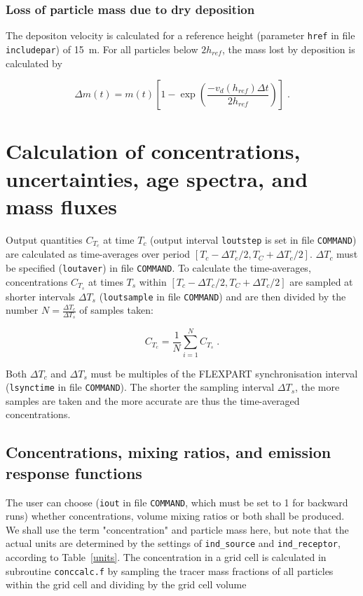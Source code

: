 \documentclass{egu}                  %
\begin{document}
\subsubsection{Loss of particle mass due to dry deposition}

The depositon velocity is calculated for a reference height (parameter
\verb|href| in file \verb|includepar|) of 15~m.  For all particles below
$2h_{ref}$, the mass lost by deposition is calculated by

\begin{equation}
\Delta m(t)=m(t)\left[{1-\exp\left({\frac{-v_d(h_{ref})\Delta t}{2h_{ref}}}\right)}\right] \;.
\end{equation}

\section{\label{conccalc}Calculation of concentrations, uncertainties, age spectra, and mass fluxes}

Output quantities $C_{T_c}$ at time $T_c$ (output interval \verb|loutstep| is
set in file \verb|COMMAND|) are calculated as time-averages over period
$[T_c-\Delta T_c/2,T_C+\Delta T_c/2]$.  $\Delta T_c$ must be specified
(\verb|loutaver|) in file \verb|COMMAND|.  To calculate the time-averages,
concentrations $C_{T_s}$ at times $T_s$ within $[T_c-\Delta T_c/2,T_C+\Delta
T_c/2]$ are sampled at shorter intervals $\Delta T_s$ (\verb|loutsample| in
file \verb|COMMAND|) and are then divided by the number $N=\frac{\Delta
T_c}{\Delta T_s}$ of samples taken:

\begin{equation}
C_{T_c}= \frac{1}{N} \sum_{i=1}^N {C_{T_s}} \;.
\end{equation}

Both $\Delta T_c$ and $\Delta T_s$ must be multiples of the FLEXPART
synchronisation interval (\verb|lsynctime| in file \verb|COMMAND|).  The
shorter the sampling interval $\Delta T_s$, the more samples are taken and the
more accurate are thus the time-averaged concentrations.

\subsection{Concentrations, mixing ratios, and emission response functions}

The user can choose (\verb|iout| in file \verb|COMMAND|, which must be set to 1
for backward runs) whether concentrations, volume mixing ratios or both shall
be produced.  We shall use the term "concentration" and particle mass here, but
note that the actual units are determined by the settings of \verb|ind_source|
and \verb|ind_receptor|, according to Table~\ref{units}.  The concentration in
a grid cell is calculated in subroutine \verb|conccalc.f| by sampling the
tracer mass fractions of all particles within the grid cell and dividing by the
grid cell volume
\end{document}
